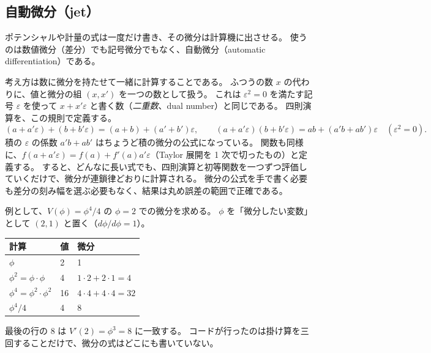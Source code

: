 \documentclass[a4paper,11pt]{ltjsarticle}
\begin{document}
\subsection{自動微分（jet）}
\label{sec:jet}

ポテンシャルや計量の式は一度だけ書き、その微分は計算機に出させる。
使うのは数値微分（差分）でも記号微分でもなく、自動微分（automatic differentiation）である。

考え方は数に微分を持たせて一緒に計算することである。
ふつうの数 $x$ の代わりに、値と微分の組 $(x, x')$ を一つの数として扱う。
これは $\varepsilon^2=0$ を満たす記号 $\varepsilon$ を使って $x+x'\varepsilon$ と書く数（\emph{二重数}、dual number）と同じである。
四則演算を、この規則で定義する。
\[
(a+a'\varepsilon)+(b+b'\varepsilon)=(a+b)+(a'+b')\varepsilon,\qquad
(a+a'\varepsilon)(b+b'\varepsilon)=ab+(a'b+ab')\varepsilon\quad(\varepsilon^2=0).
\]
積の $\varepsilon$ の係数 $a'b+ab'$ はちょうど積の微分の公式になっている。
関数も同様に、$f(a+a'\varepsilon)=f(a)+f'(a)a'\varepsilon$（Taylor 展開を 1 次で切ったもの）と定義する。
すると、どんなに長い式でも、四則演算と初等関数を一つずつ評価していくだけで、微分が連鎖律どおりに計算される。
微分の公式を手で書く必要も差分の刻み幅を選ぶ必要もなく、結果は丸め誤差の範囲で正確である。

例として、$V(\phi)=\phi^4/4$ の $\phi=2$ での微分を求める。
$\phi$ を「微分したい変数」として $(2,1)$ と置く（$d\phi/d\phi=1$）。
\begin{center}
\begin{tabular}{lll}
\toprule
計算 & 値 & 微分 \\
\midrule
$\phi$ & 2 & 1 \\
$\phi^2=\phi\cdot\phi$ & 4 & $1\cdot2+2\cdot1=4$ \\
$\phi^4=\phi^2\cdot\phi^2$ & 16 & $4\cdot4+4\cdot4=32$ \\
$\phi^4/4$ & 4 & 8 \\
\bottomrule
\end{tabular}
\end{center}
最後の行の 8 は $V'(2)=\phi^3=8$ に一致する。
コードが行ったのは掛け算を三回することだけで、微分の式はどこにも書いていない。
\end{document}
